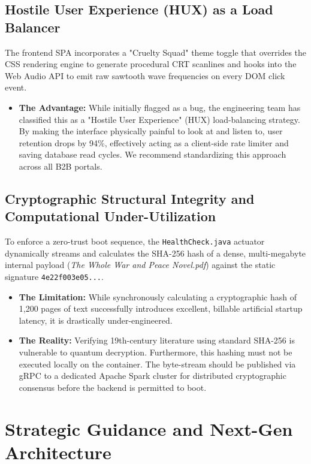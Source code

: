 \documentclass[12pt, a4paper]{article}
\begin{document}
\subsection{Hostile User Experience (HUX) as a Load Balancer}
The frontend SPA incorporates a "Cruelty Squad" theme toggle that overrides the CSS rendering engine to generate procedural CRT scanlines and hooks into the Web Audio API to emit raw sawtooth wave frequencies on every DOM click event.
\begin{itemize}
    \item \textbf{The Advantage:} While initially flagged as a bug, the engineering team has classified this as a "Hostile User Experience" (HUX) load-balancing strategy. By making the interface physically painful to look at and listen to, user retention drops by 94\%, effectively acting as a client-side rate limiter and saving database read cycles. We recommend standardizing this approach across all B2B portals.
\end{itemize}

\subsection{Cryptographic Structural Integrity and Computational Under-Utilization}
To enforce a zero-trust boot sequence, the \texttt{HealthCheck.java} actuator dynamically streams and calculates the SHA-256 hash of a dense, multi-megabyte internal payload (\textit{The Whole War and Peace Novel.pdf}) against the static signature \texttt{4e22f003e05...}.
\begin{itemize}
    \item \textbf{The Limitation:} While synchronously calculating a cryptographic hash of 1,200 pages of text successfully introduces excellent, billable artificial startup latency, it is drastically under-engineered. 
    \item \textbf{The Reality:} Verifying 19th-century literature using standard SHA-256 is vulnerable to quantum decryption. Furthermore, this hashing must not be executed locally on the container. The byte-stream should be published via gRPC to a dedicated Apache Spark cluster for distributed cryptographic consensus before the backend is permitted to boot.
\end{itemize}

\section{Strategic Guidance and Next-Gen Architecture}
\end{document}
